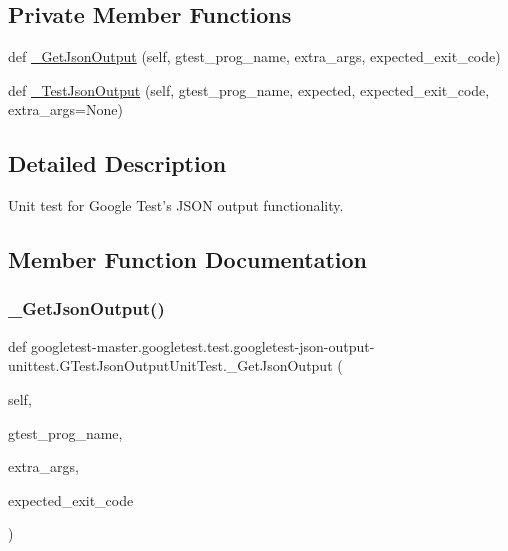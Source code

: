 \subsection*{Private Member Functions}
\begin{DoxyCompactItemize}
\item 
def \mbox{\hyperlink{classgoogletest-master_1_1googletest_1_1test_1_1googletest-json-output-unittest_1_1_g_test_json_output_unit_test_adcf1c1167f07caf4f64d3d40f30e05e2}{\+\_\+\+Get\+Json\+Output}} (self, gtest\+\_\+prog\+\_\+name, extra\+\_\+args, expected\+\_\+exit\+\_\+code)
\item 
def \mbox{\hyperlink{classgoogletest-master_1_1googletest_1_1test_1_1googletest-json-output-unittest_1_1_g_test_json_output_unit_test_ad27da27ebaa9a09128333ff3550f8cc4}{\+\_\+\+Test\+Json\+Output}} (self, gtest\+\_\+prog\+\_\+name, expected, expected\+\_\+exit\+\_\+code, extra\+\_\+args=None)
\end{DoxyCompactItemize}


\subsection{Detailed Description}
\begin{DoxyVerb}Unit test for Google Test's JSON output functionality.
\end{DoxyVerb}
 

\subsection{Member Function Documentation}
\mbox{\label{classgoogletest-master_1_1googletest_1_1test_1_1googletest-json-output-unittest_1_1_g_test_json_output_unit_test_adcf1c1167f07caf4f64d3d40f30e05e2}} 
\subsubsection{\texorpdfstring{\_GetJsonOutput()}{\_GetJsonOutput()}}
{\footnotesize\ttfamily def googletest-\/master.\+googletest.\+test.\+googletest-\/json-\/output-\/unittest.\+G\+Test\+Json\+Output\+Unit\+Test.\+\_\+\+Get\+Json\+Output (\begin{DoxyParamCaption}\item[{}]{self,  }\item[{}]{gtest\+\_\+prog\+\_\+name,  }\item[{}]{extra\+\_\+args,  }\item[{}]{expected\+\_\+exit\+\_\+code }\end{DoxyParamCaption})\hspace{0.3cm}{\ttfamily [private]}}

